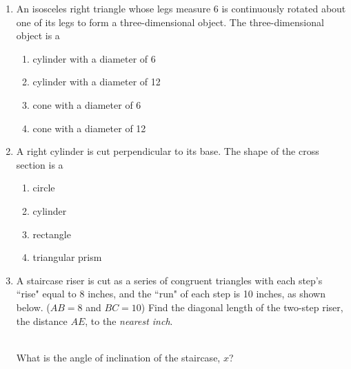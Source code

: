 \documentclass[12pt, twoside]{article}
\begin{document}
\begin{enumerate}
  \item An isosceles right triangle whose legs measure 6 is continuously rotated about one of its legs to form a three-dimensional object. The three-dimensional object is a
    \begin{enumerate}
      \item cylinder with a diameter of 6
      \item cylinder with a diameter of 12
      \item cone with a diameter of 6
      \item cone with a diameter of 12
    \end{enumerate}

    \item A right cylinder is cut perpendicular to its base. The shape of the cross section is a
      \begin{enumerate}
        \item circle
        \item cylinder
        \item rectangle
        \item triangular prism
      \end{enumerate}

      \item A staircase riser is cut as a series of congruent triangles with each step's ``rise" equal to 8 inches, and the ``run" of each step is 10 inches, as shown below. ($AB=8$ and $BC=10$) Find the diagonal length of the two-step riser, the distance $AE$, to the \emph{nearest inch}.\\[0.5cm]
            \\
          What is the angle of inclination of the staircase, $x$?

\end{enumerate}
\end{document}
